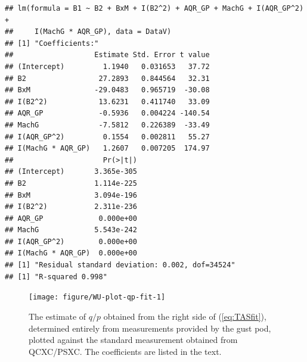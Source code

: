 \documentclass[12pt,twoside,english]{article}\usepackage[]{graphicx}\usepackage[]{color}
\makeatletter
\newenvironment{kframe}{%
 \def\at@end@of@kframe{}%
 \ifinner\ifhmode%
  \def\at@end@of@kframe{\end{minipage}}%
  \begin{minipage}{\columnwidth}%
 \fi\fi%
 \def\FrameCommand##1{\hskip\@totalleftmargin \hskip-\fboxsep
 \colorbox{shadecolor}{##1}\hskip-\fboxsep
     \hskip-\linewidth \hskip-\@totalleftmargin \hskip\columnwidth}%
 \MakeFramed {\advance\hsize-\width
   \@totalleftmargin\z@ \linewidth\hsize
   \@setminipage}}%
 {\par\unskip\endMakeFramed%
 \at@end@of@kframe}
\newenvironment{knitrout}{}{} %
\newenvironment{lyxcode}
{\par\begin{list}{}{
\setlength{\rightmargin}{\leftmargin}
\setlength{\listparindent}{0pt}%
\raggedright
\setlength{\itemsep}{0pt}
\setlength{\parsep}{0pt}
\normalfont\ttfamily}%
 \item[]}
{\end{list}}
\makeatother
\begin{document}
\begin{knitrout}\footnotesize
{}\color{fgcolor}\begin{kframe}
\begin{verbatim}
## lm(formula = B1 ~ B2 + BxM + I(B2^2) + AQR_GP + MachG + I(AQR_GP^2) + 
##     I(MachG * AQR_GP), data = DataV)
## [1] "Coefficients:"
##                   Estimate Std. Error t value
## (Intercept)         1.1940   0.031653   37.72
## B2                 27.2893   0.844564   32.31
## BxM               -29.0483   0.965719  -30.08
## I(B2^2)            13.6231   0.411740   33.09
## AQR_GP             -0.5936   0.004224 -140.54
## MachG              -7.5812   0.226389  -33.49
## I(AQR_GP^2)         0.1554   0.002811   55.27
## I(MachG * AQR_GP)   1.2607   0.007205  174.97
##                     Pr(>|t|)
## (Intercept)       3.365e-305
## B2                1.114e-225
## BxM               3.094e-196
## I(B2^2)           2.311e-236
## AQR_GP             0.000e+00
## MachG             5.543e-242
## I(AQR_GP^2)        0.000e+00
## I(MachG * AQR_GP)  0.000e+00
## [1] "Residual standard deviation: 0.002, dof=34524"
## [1] "R-squared 0.998"
\end{verbatim}
\end{kframe}
\end{knitrout}



\begin{knitrout}\footnotesize
{}\color{fgcolor}\begin{figure}

{\centering \texttt{[image: figure/WU-plot-qp-fit-1]} 

}

\caption[The estimate of $q/p$ obtained from the right side of (\ref{eq:TASfit}), determined entirely from measurements provided by the gust pod, plotted against the standard measurement obtained from QCXC/PSXC.]{The estimate of $q/p$ obtained from the right side of (\ref{eq:TASfit}), determined entirely from measurements provided by the gust pod, plotted against the standard measurement obtained from QCXC/PSXC. The coefficients are listed in the text.}\label{fig:plot-qp-fit}
\end{figure}


\end{knitrout}

\end{document}
